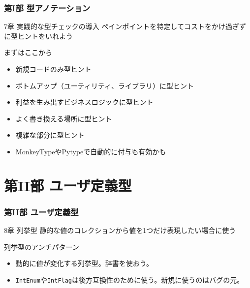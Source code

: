\documentclass[aspectratio=169,dvipdfmx,14pt,notheorems]{beamer}
\theoremstyle{definition}
\begin{document}
\begin{frame}\frametitle{第I部 型アノテーション}

\begin{block}{7章 実践的な型チェックの導入}
ペインポイントを特定してコストをかけ過ぎずに型ヒントをいれよう
\end{block}

\begin{exampleblock}{まずはここから}
\begin{itemize}
\item 新規コードのみ型ヒント
\item ボトムアップ（ユーティリティ、ライブラリ）に型ヒント
\item 利益を生み出すビジネスロジックに型ヒント
\item よく書き換える場所に型ヒント
\item 複雑な部分に型ヒント
\item MonkeyTypeやPytypeで自動的に付与も有効かも
\end{itemize}
\end{exampleblock}

\end{frame}

\section{第II部 ユーザ定義型}

\begin{frame}\frametitle{第II部 ユーザ定義型}

\begin{block}{8章 列挙型}
静的な値のコレクションから値を1つだけ表現したい場合に使う
\end{block}

\begin{alertblock}{列挙型のアンチパターン}
\begin{itemize}
\item 動的に値が変化する列挙型。辞書を使おう。
\item \texttt{IntEnum}や\texttt{IntFlag}は後方互換性のために使う。新規に使うのはバグの元。
\end{itemize}
\end{alertblock}

\end{frame}
\end{document}

